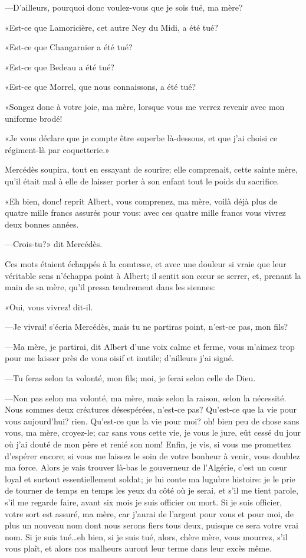 —D'ailleurs, pourquoi donc voulez-vous que je sois tué, ma mère? 

«Est-ce que Lamoricière, cet autre Ney du Midi, a été tué? 

«Est-ce que Changarnier a été tué? 

«Est-ce que Bedeau a été tué? 

«Est-ce que Morrel, que nous connaissons, a été tué? 

«Songez donc à votre joie, ma mère, lorsque vous me verrez revenir avec mon uniforme brodé! 

«Je vous déclare que je compte être superbe là-dessous, et que j'ai choisi ce régiment-là par coquetterie.» 

Mercédès soupira, tout en essayant de sourire; elle comprenait, cette sainte mère, qu'il était mal à elle de laisser porter à son enfant tout le poids du sacrifice. 

«Eh bien, donc! reprit Albert, vous comprenez, ma mère, voilà déjà plus de quatre mille francs assurés pour vous: avec ces quatre mille francs vous vivrez deux bonnes années. 

—Crois-tu?» dit Mercédès. 

Ces mots étaient échappés à la comtesse, et avec une douleur si vraie que leur véritable sens n'échappa point à Albert; il sentit son cœur se serrer, et, prenant la main de sa mère, qu'il pressa tendrement dans les siennes: 

«Oui, vous vivrez! dit-il. 

—Je vivrai! s'écria Mercédès, mais tu ne partiras point, n'est-ce pas, mon fils? 

—Ma mère, je partirai, dit Albert d'une voix calme et ferme, vous m'aimez trop pour me laisser près de vous oisif et inutile; d'ailleurs j'ai signé. 

—Tu feras selon ta volonté, mon fils; moi, je ferai selon celle de Dieu. 

—Non pas selon ma volonté, ma mère, mais selon la raison, selon la nécessité. Nous sommes deux créatures désespérées, n'est-ce pas? Qu'est-ce que la vie pour vous aujourd'hui? rien. Qu'est-ce que la vie pour moi? oh! bien peu de chose sans vous, ma mère, croyez-le; car sans vous cette vie, je vous le jure, eût cessé du jour où j'ai douté de mon père et renié son nom! Enfin, je vis, si vous me promettez d'espérer encore; si vous me laissez le soin de votre bonheur à venir, vous doublez ma force. Alors je vais trouver là-bas le gouverneur de l'Algérie, c'est un cœur loyal et surtout essentiellement soldat; je lui conte ma lugubre histoire: je le prie de tourner de temps en temps les yeux du côté où je serai, et s'il me tient parole, s'il me regarde faire, avant six mois je suis officier ou mort. Si je suis officier, votre sort est assuré, ma mère, car j'aurai de l'argent pour vous et pour moi, de plus un nouveau nom dont nous serons fiers tous deux, puisque ce sera votre vrai nom. Si je suis tué\dots eh bien, si je suis tué, alors, chère mère, vous mourrez, s'il vous plaît, et alors nos malheurs auront leur terme dans leur excès même. 

